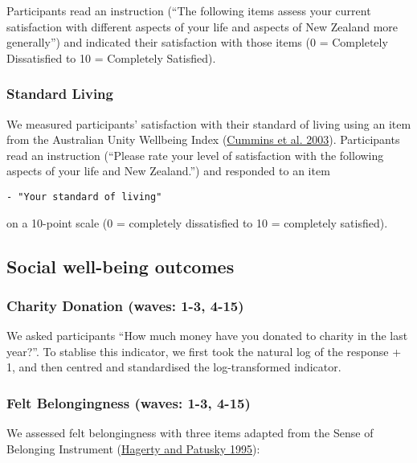 \documentclass[
  singlecolumn]{report}
\begin{document}
Participants read an instruction (``The following items assess your
current satisfaction with different aspects of your life and aspects of
New Zealand more generally'') and indicated their satisfaction with
those items (0 = Completely Dissatisfied to 10 = Completely Satisfied).

\hypertarget{standard-living}{%
\subsubsection{Standard Living}\label{standard-living}}

We measured participants' satisfaction with their standard of living
using an item from the Australian Unity Wellbeing Index
(\protect\hyperlink{ref-cummins_developing_2003}{Cummins et al. 2003}).
Participants read an instruction (``Please rate your level of
satisfaction with the following aspects of your life and New Zealand.'')
and responded to an item

\begin{verbatim}
- "Your standard of living"
\end{verbatim}

on a 10-point scale (0 = completely dissatisfied to 10 = completely
satisfied).

\hypertarget{social-well-being-outcomes}{%
\subsection{Social well-being
outcomes}\label{social-well-being-outcomes}}

\hypertarget{charity-donation-waves-1-3-4-15}{%
\subsubsection{Charity Donation (waves: 1-3,
4-15)}\label{charity-donation-waves-1-3-4-15}}

We asked participants ``How much money have you donated to charity in
the last year?''. To stablise this indicator, we first took the natural
log of the response + 1, and then centred and standardised the
log-transformed indicator.

\hypertarget{felt-belongingness-waves-1-3-4-15}{%
\subsubsection{Felt Belongingness (waves: 1-3,
4-15)}\label{felt-belongingness-waves-1-3-4-15}}

We assessed felt belongingness with three items adapted from the Sense
of Belonging Instrument (\protect\hyperlink{ref-hagerty1995}{Hagerty and
Patusky 1995}):
\end{document}

